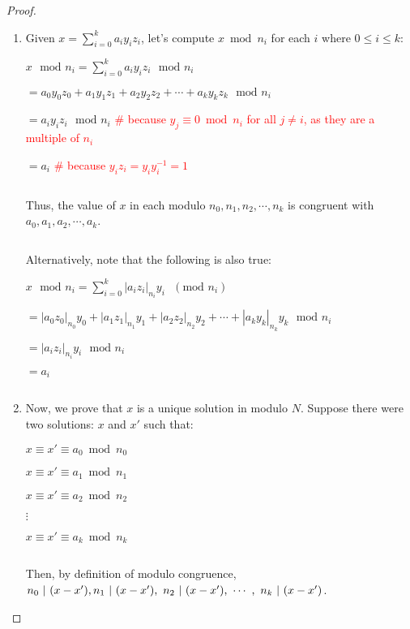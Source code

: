 \begin{proof}

$ $

\begin{enumerate}
\item Given $x = \sum\limits_{i=0}^k a_i y_i z_i$, let's compute $x \bmod n_i$ for each $i$ where $0 \leq i \leq k$: 

$x \text{ } \text{mod } n_i = \sum\limits_{i=0}^k a_i y_i z_i \text{ } \text{mod } n_i$

$= a_0 y_0 z_0 + a_1 y_1 z_1 + a_2 y_2 z_2 + \cdots + a_k y_k z_k \text{ } \text{mod } n_i$

$= a_i y_i z_i \text{ } \text{mod } n_i$ \textcolor{red}{ \# because $y_j \equiv 0 \bmod n_i$ for all $j \neq i$, as they are a multiple of $n_i$}

$= a_i$ \textcolor{red}{ \# because $y_i z_i = y_i y_i^{-1} = 1$}

$ $

Thus, the value of $x$ in each modulo $n_0, n_1, n_2, \cdots, n_k$ is congruent with $a_0, a_1, a_2, \cdots, a_k$.


$ $

Alternatively, note that the following is also true:

$x \text{ } \text{mod } n_i = \sum\limits_{i=0}^k |a_i z_i|_{n_i} y_i \text{ } (\text{mod } n_i)$

$= |a_0 z_0|_{n_0} y_0 + |a_1 z_1|_{n_1} y_1 + |a_2 z_2|_{n_2} y_2 + \cdots + |a_k y_k|_{n_k} y_k \text{ } \text{mod } n_i$

$= |a_i z_i|_{n_i} y_i \text{ } \text{mod } n_i$ 

$= a_i$ 

$ $

\item Now, we prove that $x$ is a unique solution in modulo $N$. Suppose there were two solutions: $x$ and $x'$ such that:

$x \equiv x' \equiv a_0 \bmod n_0$

$x \equiv x' \equiv a_1 \bmod n_1$

$x \equiv x' \equiv a_2 \bmod n_2$

\text{ } $\vdots$

$x \equiv x' \equiv a_k \bmod n_k$

$ $

Then, by definition of modulo congruence, $ n_0 \text{ } \text{$|$} \text{ } (x - x') , n_1 \text{ } \text{$|$} \text{ } (x - x') , \text{ } n_2 \text{ } \text{$|$} \text{ } (x - x'), \text{ } \text{$\cdots$} \text{ }, \text{ } n_k \text{ } \text{$|$} \text{ } (x - x')$.   


\end{enumerate}
\end{proof}
